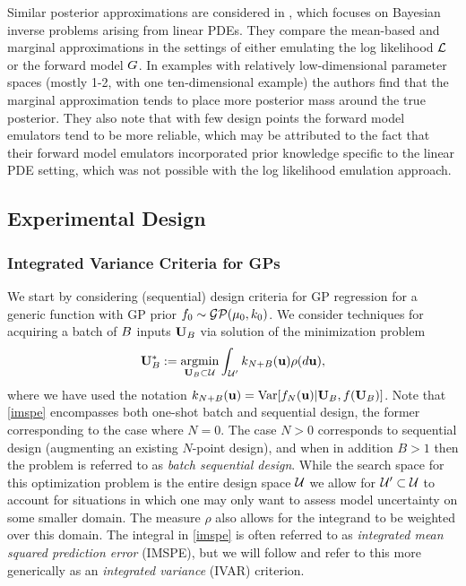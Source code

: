 \documentclass[12pt]{article}
\begin{document}
Similar posterior approximations are considered in \cite{GP_PDE_priors}, which focuses on Bayesian inverse problems arising from linear PDEs. They 
compare the mean-based and marginal approximations in the settings of either emulating the log likelihood $\llik$ or the forward model $\fwd$. In examples 
with relatively low-dimensional parameter spaces (mostly 1-2, with one ten-dimensional example) the authors find that the marginal approximation tends to 
place more posterior mass around the true posterior. They also note that with few design points the forward model emulators tend to be more reliable, which 
may be attributed to the fact that their forward model emulators incorporated prior knowledge specific to the linear PDE setting, which was not possible with 
the log likelihood emulation approach. 

\subsection{Experimental Design}


\subsubsection{Integrated Variance Criteria for GPs}
We start by considering (sequential) design criteria for GP regression for a generic function with GP prior $f_0 \sim \GP(\GPMeanPred[0], \GPKerPred[0])$.
We consider techniques for acquiring a batch of $\Nbatch$ inputs $\inputMatBatch$ via solution of the minimization problem
\begin{align}
\inputMatBatch^* := \argmin_{\inputMatBatch \subset \parSpace} \int_{\parSpace^\prime}  \GPKerPred[\Ndesign + \Nbatch](\bpar) \rho(d\bpar), \label{imspe}
\end{align}
where we have used the notation $\GPKerPred[\Ndesign + \Nbatch](\bpar) = \Var[f_N(\bpar)|\inputMatBatch, f(\inputMatBatch)]$. Note that \ref{imspe} 
encompasses both one-shot batch and sequential design, the former corresponding to the case where $N=0$. The case $N > 0$ corresponds to 
sequential design (augmenting an existing $N$-point design), and when in addition $B > 1$ then the problem is referred to as \textit{batch sequential design}. 
While the search space for this optimization problem is the entire design space $\parSpace$ we allow for $\parSpace^\prime \subset \parSpace$ to account 
for situations in which one may only want to assess model uncertainty on some smaller domain. The measure $\rho$ also allows for the integrand to be 
weighted over this domain. The integral in \ref{imspe} is often referred to as \textit{integrated mean squared prediction error} (IMSPE), but we will 
follow \cite{Mercer_kernels_IVAR} and refer to this more generically as an \textit{integrated variance} (IVAR) criterion. 
\end{document}
